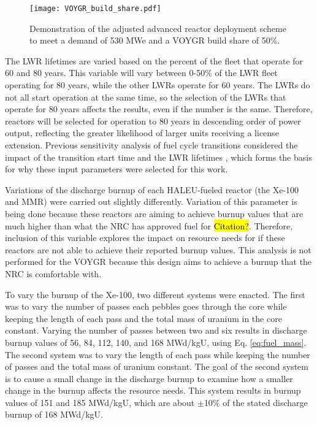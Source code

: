 \begin{figure}
    \centering 
    \texttt{[image: VOYGR\_build\_share.pdf]}
    \caption{Demonstration of the adjusted advanced reactor deployment 
    scheme to meet a demand of 530 MWe and a VOYGR build share of 
    50\%.}
    \label{fig:build-share-deploy}
\end{figure}

The \gls{LWR} lifetimes are varied based 
on the percent of the fleet that operate for 60 and 80 years. This 
variable will vary between 0-50\% of the \gls{LWR} fleet operating for 80 
years, while the other \glspl{LWR} operate for 60 years. The 
\glspl{LWR} do not all start operation at the same time, so the 
selection of the \glspl{LWR} that operate for 80 years affects the results, 
even if the number is the same. Therefore, reactors will be selected for 
operation to 80 years in 
descending order of power output, reflecting the greater likelihood of 
larger units receiving a license extension. Previous sensitivity analysis of 
fuel cycle transitions considered the impact of the transition start time 
and the \gls{LWR} lifetimes \cite{chee_sensitivity_2019,feng_sensitivity_2020},
which forms the basis for why these input parameters were selected for this 
work.

Variations of the discharge burnup of each \gls{HALEU}-fueled reactor (the 
Xe-100 and \gls{MMR}) were carried out slightly differently. Variation 
of this parameter is being done because these reactors are aiming to achieve 
burnup values that are much higher than what the NRC has approved fuel for 
\hl{Citation?}. Therefore, inclusion of this variable explores the impact 
on resource needs for if these reactors are not able to achieve their 
reported burnup values. This analysis is not performed for the VOYGR because this 
design aims to achieve a burnup that the NRC is comfortable with. 

To vary the burnup of the Xe-100, two different systems were enacted. The 
first was to vary the number of passes each pebbles goes through the core
while keeping the length of each pass and the total mass of uranium 
in the core constant. Varying the number of passes between two and six 
results in discharge burnup values of 56, 84, 112, 140, and 168 MWd/kgU, 
using Eq. \ref{eq:fuel_mass}. The second system was to vary the length 
of each pass while keeping the number of passes and the total mass of uranium 
constant. The goal of the second system is to cause a small change in the 
discharge burnup to examine how a smaller change in the burnup affects 
the resource needs. This system results in burnup values of 151 and 185 MWd/kgU, 
which are about $\pm$10\% of the stated discharge burnup of 168 MWd/kgU. 

